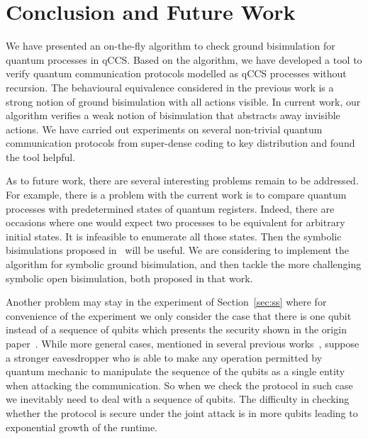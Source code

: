 \documentclass[a4paper,runningheads]{llncs}
\begin{document}
\section{Conclusion and Future Work}\label{sec:con}
We have presented an on-the-fly algorithm to check ground bisimulation for quantum processes in qCCS. Based on the algorithm, we have developed a tool to verify quantum communication protocols modelled as qCCS processes without recursion. The behavioural equivalence considered in the previous work is a strong notion of ground bisimulation with all actions visible. In current work, our algorithm verifies a weak notion of bisimulation that abstracts away invisible actions. We have carried out experiments on several non-trivial quantum communication protocols from super-dense coding to key distribution and found the tool helpful.

As to future work, there are several interesting problems remain to be addressed.
For example, there is a problem with the current work is to compare quantum processes with predetermined states of quantum registers. Indeed, there are occasions where one would expect two processes to be equivalent for arbitrary initial states. It is infeasible to enumerate all those states. Then the symbolic bisimulations proposed in~\cite{FDY14} will be useful. We are considering to implement the algorithm for symbolic ground bisimulation, and then tackle the more challenging symbolic open bisimulation, both proposed in that work. 

Another problem may stay in the experiment of Section~\ref{sec:ss} where for convenience of the experiment we only consider the case that there is one qubit instead of a sequence of qubits which presents the security shown in the origin paper~\cite{BB84}. While more general cases, mentioned in several previous works~\cite{Mayers98,LC99,SP00}, suppose a stronger eavesdropper who is able to make any operation permitted by quantum mechanic to manipulate the sequence of the qubits as a single entity when attacking the communication. So when we check the protocol in such case we inevitably need to deal with a sequence of qubits. The difficulty in checking whether the protocol is secure under the joint attack is in more qubits leading to exponential growth of the runtime.
%
%
%
% 
% 
%


\end{document}
